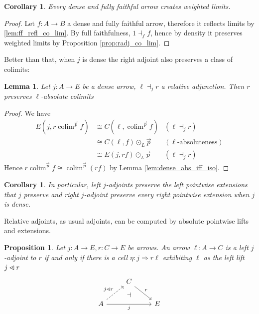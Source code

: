 \documentclass[10pt,a4paper]{article}
\newcommand{\flip}[1]{\text{\rotatebox[origin=c]{-180}{$#1$}}}
\newcommand{\To}{\Rightarrow}
\newcommand{\plift}{\mathbin{\flip{{\rhd}\mathclap{\mspace{-17.5mu}\cdot}}}}
\newcommand{\simeqq}{\cong}
\DeclareMathOperator{\colim}{colim}
\theoremstyle{plain}
\newtheorem{proposition}[theorem]{Proposition}
\newtheorem{corollary}[theorem]{Corollary}
\newtheorem{lemma}[theorem]{Lemma}
\theoremstyle{definition}
\theoremstyle{remark}
\begin{document}
\begin{corollary}
    \label{cor:dense_ff_cr_lim}
    Every dense and fully faithful arrow creates weighted limits.
\end{corollary}

\begin{proof}
    Let $f : A \to B$ a dense and fully faithful arrow, therefore it reflects limits by \ref{lem:ff_refl_co_lim}. By full faithfulness, $1\dashv_ff$, hence by density it preserves weighted limits by Proposition \ref{prop:radj_co_lim}.
\end{proof}

Better than that, when $j$ is dense the right adjoint also preserves a class of colimits:

\begin{lemma}
    \label{lem:radj_right_labs_colim}
    Let $j : A \to E$ be a dense arrow, $\ell\dashv_j r$ a relative adjunction. Then $r$ preserves $\ell$-absolute colimits
\end{lemma}

\begin{proof}
    We have
    \begin{align*}
        E(j, r\colim^{\vec p}f) &\simeqq C(\ell, \colim^{\vec p}f) & (\ell\dashv_jr)\\
                                &\simeqq C(\ell, f)\odot_L\vec p & (\ell\text{-absoluteness})\\
                                &\simeqq E(j, rf)\odot_L\vec p & (\ell\dashv_jr)
    \end{align*}
    Hence $r\colim^{\vec p}f\simeqq\colim^{\vec p}(rf)$ by Lemma \ref{lem:dense_abs_iff_iso}.
\end{proof}

\begin{corollary}
    In particular, left $j$-adjoints preserve the left pointwise extensions that $j$ preserve and right $j$-adjoint preserve every right pointwise extension when $j$ is dense.
\end{corollary}

Relative adjoints, as usual adjoints, can be computed by absolute pointwise lifts and  extensions.

\begin{proposition}
    Let $j : A \to E, r : C \to E$ be arrows. An arrow $\ell : A \to C$ is a left $j$-adjoint to $r$ if and only if there is a cell $\eta : j \To r\ell$ exhibiting $\ell$ as the left lift $j\plift r$
    \[\begin{tikzcd}
        &  C \ar[dr, "r"] &\\
        A \ar[ur, dashed, "j\plift r"] \ar[rr, "j"'] &{}& E
        \ar[from=1-2, to=2-2, phantom, "\dashv"{anchor=center}]
    \end{tikzcd}\]
\end{proposition}
\end{document}
